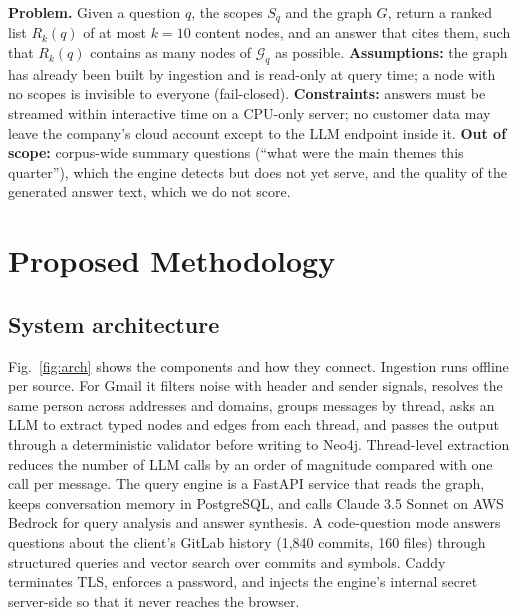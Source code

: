 \documentclass[12pt,onecolumn,draftclsnofoot]{IEEEtran}
\begin{document}
\textbf{Problem.} Given a question $q$, the scopes $S_q$ and the graph $G$, return a ranked list $R_k(q)$ of at most $k=10$ content nodes, and an answer that cites them, such that $R_k(q)$ contains as many nodes of $\mathcal{G}_q$ as possible. \textbf{Assumptions:} the graph has already been built by ingestion and is read-only at query time; a node with no scopes is invisible to everyone (fail-closed). \textbf{Constraints:} answers must be streamed within interactive time on a CPU-only server; no customer data may leave the company's cloud account except to the LLM endpoint inside it. \textbf{Out of scope:} corpus-wide summary questions (``what were the main themes this quarter''), which the engine detects but does not yet serve, and the quality of the generated answer text, which we do not score.

\section{Proposed Methodology}

\subsection{System architecture}
Fig.~\ref{fig:arch} shows the components and how they connect. Ingestion runs offline per source. For Gmail it filters noise with header and sender signals, resolves the same person across addresses and domains, groups messages by thread, asks an LLM to extract typed nodes and edges from each thread, and passes the output through a deterministic validator before writing to Neo4j. Thread-level extraction reduces the number of LLM calls by an order of magnitude compared with one call per message. The query engine is a FastAPI service that reads the graph, keeps conversation memory in PostgreSQL, and calls Claude 3.5 Sonnet on AWS Bedrock for query analysis and answer synthesis. A code-question mode answers questions about the client's GitLab history (1,840 commits, 160 files) through structured queries and vector search over commits and symbols. Caddy terminates TLS, enforces a password, and injects the engine's internal secret server-side so that it never reaches the browser.
\end{document}
